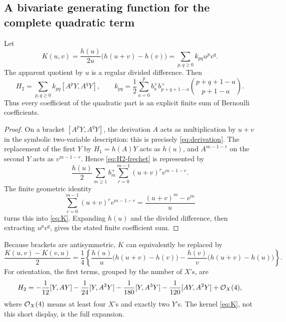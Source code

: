 \subsection{A bivariate generating function for the complete quadratic term}
\begin{theorem}\label{thm:quadratic-kernel}
Let
\begin{equation}\label{eq:K}
 K(u,v)=\frac{h(u)}{2u}\bigl(h(u+v)-h(v)\bigr)
       =\sum_{p,q\geq0}k_{pq}u^pv^q.
\end{equation}
The apparent quotient by $u$ is a regular divided difference. Then
\begin{equation}\label{eq:H2-kernel}
 \boxed{\displaystyle
 H_2=\sum_{p,q\geq0}k_{pq}[A^pY,A^qY],\qquad
 k_{pq}=\frac12\sum_{a=0}^{p}b_a^+b_{p+q+1-a}^+
                 \binom{p+q+1-a}{p+1-a}.}
\end{equation}
Thus every coefficient of the quadratic part is an explicit finite sum of Bernoulli coefficients.
\end{theorem}
\begin{proof}
On a bracket $[A^pY,A^qY]$, the derivation $A$ acts as multiplication by $u+v$ in the symbolic two-variable description: this is precisely \cref{eq:derivation}. The replacement of the first $Y$ by $H_1=h(A)Y$ acts as $h(u)$, and $A^{m-1-r}$ on the second $Y$ acts as $v^{m-1-r}$. Hence \cref{eq:H2-frechet} is represented by
\[
 \frac{h(u)}2\sum_{m\geq1}b_m^+
 \sum_{r=0}^{m-1}(u+v)^r v^{m-1-r}.
\]
The finite geometric identity
\[
 \sum_{r=0}^{m-1}(u+v)^r v^{m-1-r}
 =\frac{(u+v)^m-v^m}{u}
\]
turns this into \cref{eq:K}. Expanding $h(u)$ and the divided difference, then extracting $u^pv^q$, gives the stated finite coefficient sum.
\end{proof}
Because brackets are antisymmetric, $K$ can equivalently be replaced by
\[
 \frac{K(u,v)-K(v,u)}2
 =\frac14\left\{
 \frac{h(u)}u\bigl(h(u+v)-h(v)\bigr)
 -\frac{h(v)}v\bigl(h(u+v)-h(u)\bigr)\right\}.
\]
For orientation, the first terms, grouped by the number of $X$'s, are
\begin{equation}\label{eq:H2-first}
 H_2=-\frac1{12}[Y,AY]-\frac1{24}[Y,A^2Y]
     -\frac1{180}[Y,A^3Y]-\frac1{120}[AY,A^2Y]
     +\mathcal O_X(4),
\end{equation}
where $\mathcal O_X(4)$ means at least four $X$'s and exactly two $Y$'s. The kernel \cref{eq:K}, not this short display, is the full expansion.


